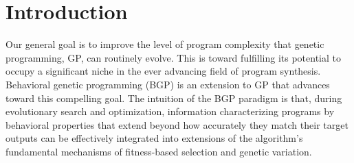 \newcommand{\st}{subprogram\xspace} 

\section{Introduction}\label{sect:intro}
Our general goal is to improve the level of program complexity that genetic programming, GP, can routinely evolve. This is toward fulfilling its potential to occupy a significant niche in the ever advancing field of program synthesis.  Behavioral genetic programming (BGP) is an extension to GP that advances toward this compelling goal\cite{KrawiecGECCO2014,KrawiecBPS2016}. The intuition of the BGP paradigm is that, during evolutionary search and optimization, information characterizing programs by behavioral properties that extend beyond how accurately they match their target outputs can be effectively integrated into extensions of the algorithm's fundamental mechanisms of fitness-based selection and genetic variation. 

